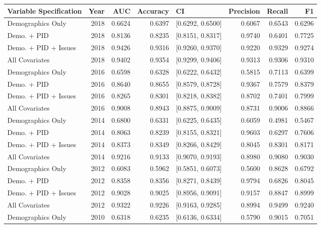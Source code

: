 \begin{table}[H]
\centering
\begin{tabular}{lrrrlrrr}
  \toprule
Variable Specification & Year & AUC & Accuracy & CI & Precision & Recall & F1 \\ 
  \midrule
Demographics Only & 2018 & 0.6624 & 0.6397 & [0.6292, 0.6500] & 0.6067 & 0.6543 & 0.6296 \\ 
  Demo. + PID & 2018 & 0.8136 & 0.8235 & [0.8151, 0.8317] & 0.9740 & 0.6401 & 0.7725 \\ 
  Demo. + PID + Issues & 2018 & 0.9426 & 0.9316 & [0.9260, 0.9370] & 0.9220 & 0.9329 & 0.9274 \\ 
  All Covariates & 2018 & 0.9402 & 0.9354 & [0.9299, 0.9406] & 0.9313 & 0.9306 & 0.9310 \\ 
  Demographics Only & 2016 & 0.6598 & 0.6328 & [0.6222, 0.6432] & 0.5815 & 0.7113 & 0.6399 \\ 
  Demo. + PID & 2016 & 0.8640 & 0.8655 & [0.8579, 0.8728] & 0.9367 & 0.7579 & 0.8379 \\ 
  Demo. + PID + Issues & 2016 & 0.8265 & 0.8301 & [0.8218, 0.8382] & 0.8702 & 0.7401 & 0.7999 \\ 
  All Covariates & 2016 & 0.9008 & 0.8943 & [0.8875, 0.9009] & 0.8731 & 0.9006 & 0.8866 \\ 
  Demographics Only & 2014 & 0.6800 & 0.6331 & [0.6225, 0.6435] & 0.6059 & 0.4981 & 0.5467 \\ 
  Demo. + PID & 2014 & 0.8063 & 0.8239 & [0.8155, 0.8321] & 0.9603 & 0.6297 & 0.7606 \\ 
  Demo. + PID + Issues & 2014 & 0.8373 & 0.8349 & [0.8266, 0.8429] & 0.8045 & 0.8301 & 0.8171 \\ 
  All Covariates & 2014 & 0.9216 & 0.9133 & [0.9070, 0.9193] & 0.8980 & 0.9080 & 0.9030 \\ 
  Demographics Only & 2012 & 0.6083 & 0.5962 & [0.5851, 0.6073] & 0.5600 & 0.8628 & 0.6792 \\ 
  Demo. + PID & 2012 & 0.8358 & 0.8356 & [0.8271, 0.8439] & 0.9794 & 0.6826 & 0.8045 \\ 
  Demo. + PID + Issues & 2012 & 0.9028 & 0.9025 & [0.8956, 0.9091] & 0.9157 & 0.8847 & 0.8999 \\ 
  All Covariates & 2012 & 0.9322 & 0.9226 & [0.9163, 0.9285] & 0.8994 & 0.9499 & 0.9240 \\ 
  Demographics Only & 2010 & 0.6318 & 0.6235 & [0.6136, 0.6334] & 0.5790 & 0.9015 & 0.7051 \\ 

\end{tabular}
\end{table}
